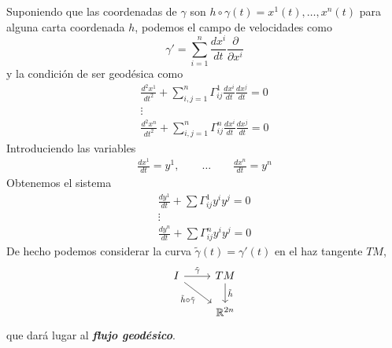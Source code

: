 \documentclass[spanish]{book}
\theoremstyle{definition}
\newcommand{\R}{\mathbb{R}}
\begin{document}
	Suponiendo que las coordenadas de $\gamma$ son $h\circ\gamma(t)=x^1(t),\ldots,x^n(t)$ para alguna carta coordenada $h$, podemos el campo de velocidades como
	\[\gamma'=\sum_{i=1}^n\frac{dx^i}{dt}\frac{\partial}{\partial x^i}\]
	y la condición de ser geodésica como
	\begin{gather*}
		\frac{d^2x^1}{dt^2}+\sum_{i,j=1}^n\Gamma_{ij}^1\frac{dx^i}{dt}\frac{dx^j}{dt}=0\\
		\vdots\\
		\frac{d^2x^n}{dt^2}+\sum_{i,j=1}^n\Gamma_{ij}^n\frac{dx^i}{dt}\frac{dx^j}{dt}=0
	\end{gather*}
	Introduciendo las variables
	\begin{gather*}
		\frac{dx^1}{dt}=y^1,\qquad	\ldots \qquad
		\frac{dx^n}{dt}=y^n
	\end{gather*}
	Obtenemos el sistema
	\begin{gather*}
		\frac{dy^1}{dt}+\sum\Gamma_{ij}^1y^iy^j=0\\
		\vdots\\
		\frac{dy^n}{dt}+\sum\Gamma_{ij}^ny^iy^j=0
	\end{gather*}
	De hecho podemos considerar la curva $\tilde{\gamma}(t)=\gamma'(t)$ en el haz tangente $TM$,
	\[\begin{tikzcd}
		I\arrow{r}{\tilde{\gamma}}\arrow[swap]{rd}{\tilde{h}\circ\tilde{\gamma}}& TM\arrow{d}{\tilde{h}}\\
			&\R^{2n}		
	\end{tikzcd}\]
	que dará lugar al \textbf{\textit{flujo geodésico}}.
	
\end{document}
